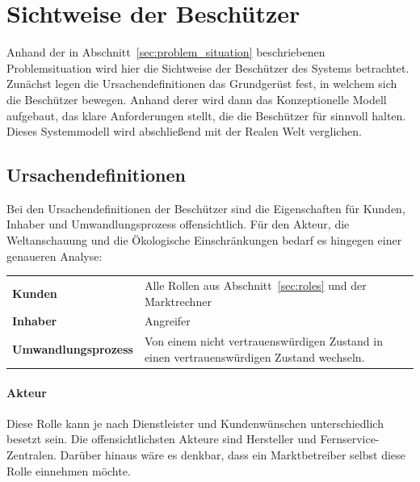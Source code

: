 \documentclass[11pt,a4paper]{report}
\begin{document}
\section{Sichtweise der Beschützer} 

Anhand der in Abschnitt~\ref{sec:problem_situation} beschriebenen Problemsituation wird hier die Sichtweise der Beschützer des Systems betrachtet. Zunächst legen die Ursachendefinitionen das Grundgerüst fest, in welchem sich die Beschützer bewegen. Anhand derer wird dann das Konzeptionelle Modell aufgebaut, das klare Anforderungen stellt, die die Beschützer für sinnvoll halten. Dieses Systemmodell wird abschließend mit der Realen Welt verglichen.

\subsection{Ursachendefinitionen}

Bei den Ursachendefinitionen der Beschützer sind die Eigenschaften für Kunden, Inhaber und Umwandlungsprozess offensichtlich. Für den Akteur, die Weltanschauung und die Ökologische Einschränkungen bedarf es hingegen einer genaueren Analyse:

\setlength{\tabcolsep}{12pt}
\renewcommand{\arraystretch}{1.5}
\begin{table}[h] %
\begin{tabularx}{\linewidth}{@{}lX@{}}
\textbf{Kunden} & Alle Rollen aus Abschnitt~\ref{sec:roles} und der Marktrechner\\
\textbf{Inhaber} & Angreifer\\
\textbf{Umwandlungsprozess} & 
Von einem nicht vertrauenswürdigen Zustand in einen vertrauenswürdigen Zustand wechseln.\\
\end{tabularx}
\end{table}

\paragraph{Akteur} Diese Rolle kann je nach Dienstleister und Kundenwünschen unterschiedlich besetzt sein. Die offensichtlichsten Akteure sind Hersteller und Fernservice-Zentralen. Darüber hinaus wäre es denkbar, dass ein Marktbetreiber selbst diese Rolle einnehmen möchte.
\end{document}
